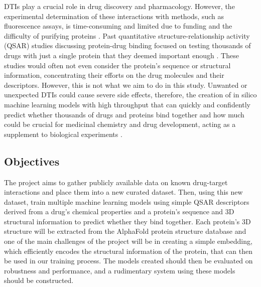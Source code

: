 DTIs play a crucial role in drug discovery and pharmacology. However, the experimental determination of these interactions with methods, such as fluorescence assays, is time-consuming and limited due to funding and the difficulty of purifying proteins \citep{Shar2016, Wang2020}. Past quantitative structure-relationship activity (QSAR) studies discussing protein-drug binding focused on testing thousands of drugs with just a single protein that they deemed important enough \citep{Colmenarejo2003, Estrada2006, Vallianatou2013}. These studies would often not even consider the protein's sequence or structural information, concentrating their efforts on the drug molecules and their descriptors. However, this is not what we aim to do in this study. Unwanted or unexpected DTIs could cause severe side effects, therefore, the creation of in silico machine learning models with high throughput that can quickly and confidently predict whether thousands of drugs and proteins bind together and how much could be crucial for medicinal chemistry and drug development, acting as a supplement to biological experiments \citep{Shar2016, Wang2020}.

\subsection{Objectives}
\label{subsec:Objectives}

The project aims to gather publicly available data on known drug-target interactions and place them into a new curated dataset. Then, using this new dataset, train multiple machine learning models using simple QSAR descriptors derived from a drug's chemical properties and a protein's sequence and 3D structural information to predict whether they bind together. Each protein's 3D structure will be extracted from the AlphaFold protein structure database \citep{Jumper2021, Varadi2022} and one of the main challenges of the project will be in creating a simple embedding, which efficiently encodes the structural information of the protein, that can then be used in our training process. The models created should then be evaluated on robustness and performance, and a rudimentary system using these models should be constructed.

\pagebreak





